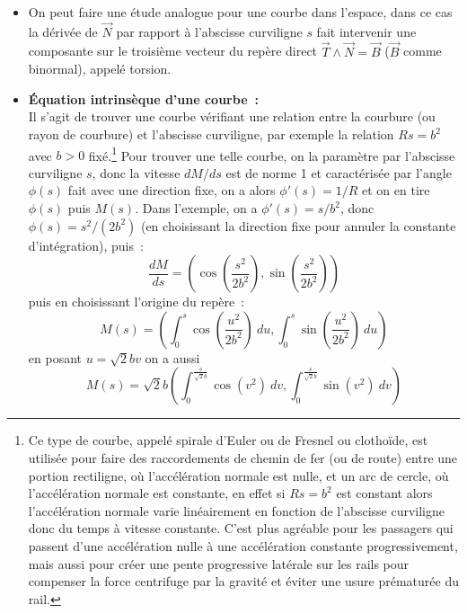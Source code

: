 \documentclass[a4paper,11pt]{article}
\begin{document}
\begin{itemize}
aux rayons lumineux (pour d\'eterminer 
l'anticaustique d'une courbe par rapport
\`a une droite, on prend un point de la courbe, on le proj\`ete sur
la droite puis on prend le sym\'etrique du projet\'e par rapport \`a la
tangente \`a la courbe au point choisi, 
l'anticaustique est le lieu de ces sym\'etriques). 
Cf. dans Xcas la session exemple du
menu \verb|Exemple, geometrie, caustique|.
Les d\'evelopp\'ees peuvent aussi servir dans le calcul de caustiques
par r\'efraction~:
\verb|http://www.mathcurve.com/courbes2d/caustic/caustic.htm|
\item On peut faire une \'etude analogue pour une courbe dans
  l'espace, dans ce cas la d\'eriv\'ee de $\overrightarrow{N}$
par rapport \`a l'abscisse curviligne $s$ fait intervenir une
composante sur le troisi\`eme vecteur du rep\`ere direct
$\overrightarrow{T} \wedge\overrightarrow{N}=\overrightarrow{B}$ 
($\overrightarrow{B}$ comme binormal), appel\'e
torsion.
\item {\bf \'Equation intrins\`eque d'une courbe~:}\\
Il s'agit de trouver une courbe v\'erifiant une relation entre la
courbure (ou rayon de courbure) et l'abscisse curviligne, par exemple
la relation $Rs=b^2$ avec $b>0$ fix\'e.\footnote{Ce type de courbe, appel\'e
spirale d'Euler ou de Fresnel ou clotho\"ide, est utilis\'ee pour
faire des raccordements de chemin de fer (ou de route) 
entre une portion rectiligne, o\`u l'acc\'el\'eration normale est
nulle, et un arc de cercle, o\`u l'acc\'el\'eration normale est
constante, en effet si $Rs=b^2$ est constant alors l'acc\'el\'eration
normale varie lin\'eairement en fonction de l'abscisse curviligne
donc du temps \`a vitesse constante. C'est plus agr\'eable pour
les passagers qui passent d'une acc\'el\'eration nulle \`a une
acc\'el\'eration constante progressivement, mais aussi pour
cr\'eer une pente progressive lat\'erale sur les rails pour compenser
la force centrifuge par la gravit\'e et \'eviter une usure
pr\'ematur\'ee du rail.}
Pour trouver une telle courbe, on la param\`etre par l'abscisse
curviligne $s$, donc la vitesse $dM/ds$ est de norme 1 et caract\'eris\'ee
par l'angle $\phi(s)$ fait avec une direction fixe, on a alors
$\phi'(s)=1/R$ et on en tire $\phi(s)$ puis $M(s)$. 
Dans l'exemple, on a $\phi'(s)=s/b^2$, donc $\phi(s)=s^2/(2b^2)$ (en
choisissant la direction fixe pour annuler la constante
d'int\'egration), puis~:
$$\frac{dM}{ds}=\left(\cos\left(\frac{s^2}{2b^2}\right),\sin\left(\frac{s^2}{2b^2}\right) \right) $$
puis en choisissant l'origine du rep\`ere~:
$$ M(s)=\left(
\int_0^s \cos\left(\frac{u^2}{2b^2}\right) \ du ,
\int_0^s \sin\left(\frac{u^2}{2b^2}\right)
\ du
\right)$$
en posant $u=\sqrt{2}b v$ on a aussi
$$ M(s)=\sqrt{2}b \left(\int_0^{\frac{s}{\sqrt{2}b}} \cos(v^2) \ dv ,
\int_0^{\frac{s}{\sqrt{2}b}} \sin(v^2) \ dv
\right)$$
\end{itemize}
\end{document}
